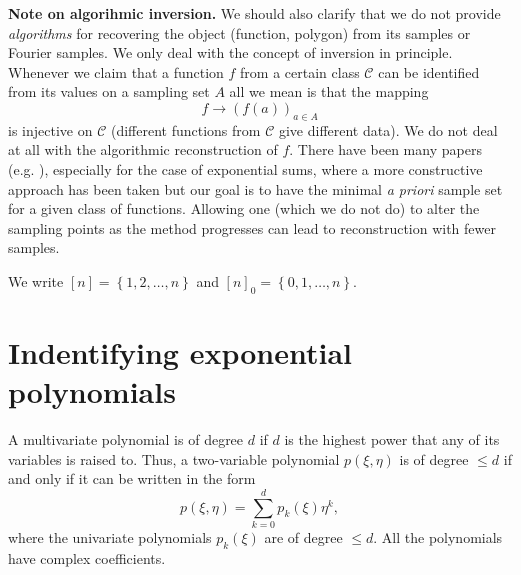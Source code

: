 \documentclass[12pt,a4paper,oneside]{amsart}
\theoremstyle{definition}
\newcommand{\Set}[1]{{\left\{{#1}\right\}}}
\newcommand{\red}[1]{{#1}}
\begin{document}
\noindent
{\bf Note on algorihmic inversion.}
We should also clarify that we do not provide \textit{algorithms} for recovering the object (function, polygon) from its samples or Fourier samples. We only deal with the concept of inversion in principle. Whenever we claim that a function $f$ from a certain class $\mathcal{C}$ can be identified from its values on a sampling set $A$ all we mean is that the mapping
$$
f \to (f(a))_{a \in A}
$$
is injective on $\mathcal{C}$ (different functions from $\mathcal{C}$ give different data). We do not deal at all with the algorithmic reconstruction of $f$. \red{There have been many papers (e.g. \cite{wischerhoff2016reconstruction,cuyt2018multivariate}), especially for the case of exponential sums, where a more constructive approach has been taken but our goal is to have the minimal \textit{a priori} sample set for a given class of functions. Allowing one (which we do not do) to alter the sampling points as the method progresses can lead to reconstruction with fewer samples.}


 We write $[n] = \Set{1, 2, \ldots, n}$ and $[n]_0 = \Set{0, 1, \ldots, n}$.



\section{Indentifying exponential polynomials}\label{s:exppoly}

A multivariate polynomial is of degree $d$ if $d$ is the highest power that any of its variables is raised to. Thus, a two-variable polynomial $p(\xi, \eta)$ is of degree $\le d$ if and only if it can be written in the form
$$
p(\xi, \eta) = \sum_{k=0}^d p_k(\xi) \eta^k,
$$
where the univariate polynomials $p_k(\xi)$ are of degree $\le d$.
All the polynomials have complex coefficients.
\end{document}
